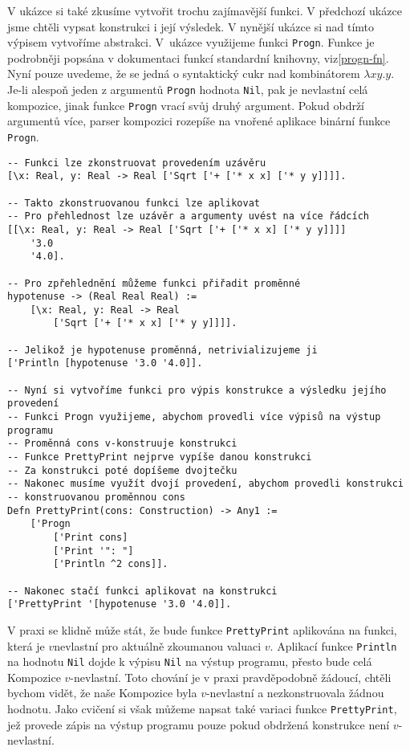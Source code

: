 V ukázce si také zkusíme vytvořit trochu zajímavější funkci. V předchozí ukázce jsme chtěli vypsat
konstrukci i její výsledek. V nynější ukázce si nad tímto výpisem vytvoříme abstrakci. V~ukázce
využijeme funkci \lstinline{Progn}. Funkce je podrobněji popsána v dokumentaci funkcí standardní
knihovny, viz\ref{progn-fn}. Nyní pouze uvedeme, že se jedná o syntaktický cukr
nad kombinátorem $\lambda x y . y$. Je-li alespoň jeden z argumentů \lstinline{Progn} hodnota
\lstinline{Nil}, pak je nevlastní celá kompozice, jinak funkce \lstinline{Progn} vrací svůj druhý
argument. Pokud obdrží argumentů více, parser kompozici rozepíše na vnořené aplikace binární funkce
\lstinline{Progn}.

\begin{lstlisting}[caption={Funkce a uzávěry}, language=Tilscript]
-- Funkci lze zkonstruovat provedením uzávěru
[\x: Real, y: Real -> Real ['Sqrt ['+ ['* x x] ['* y y]]]].

-- Takto zkonstruovanou funkci lze aplikovat
-- Pro přehlednost lze uzávěr a argumenty uvést na více řádcích
[[\x: Real, y: Real -> Real ['Sqrt ['+ ['* x x] ['* y y]]]]
    '3.0
    '4.0].

-- Pro zpřehlednění můžeme funkci přiřadit proměnné
hypotenuse -> (Real Real Real) :=
    [\x: Real, y: Real -> Real
        ['Sqrt ['+ ['* x x] ['* y y]]]].

-- Jelikož je hypotenuse proměnná, netrivializujeme ji
['Println [hypotenuse '3.0 '4.0]].

-- Nyní si vytvoříme funkci pro výpis konstrukce a výsledku jejího provedení
-- Funkci Progn využijeme, abychom provedli více výpisů na výstup programu
-- Proměnná cons v-konstruuje konstrukci
-- Funkce PrettyPrint nejprve vypíše danou konstrukci
-- Za konstrukci poté dopíšeme dvojtečku
-- Nakonec musíme využít dvojí provedení, abychom provedli konstrukci
-- konstruovanou proměnnou cons
Defn PrettyPrint(cons: Construction) -> Any1 :=
    ['Progn
        ['Print cons]
        ['Print '": "]
        ['Println ^2 cons]].

-- Nakonec stačí funkci aplikovat na konstrukci
['PrettyPrint '[hypotenuse '3.0 '4.0]].
\end{lstlisting}

V praxi se klidně může stát, že bude funkce \lstinline{PrettyPrint} aplikována na funkci,
která je $v$nevlastní pro aktuálně zkoumanou valuaci $v$. Aplikací funkce \lstinline{Println}
na hodnotu \lstinline{Nil} dojde k výpisu \lstinline{Nil} na výstup programu, přesto bude celá
Kompozice $v$-nevlastní. Toto chování je v praxi pravděpodobně žádoucí, chtěli bychom vidět, že naše
Kompozice byla $v$-nevlastní a nezkonstruovala žádnou hodnotu. Jako cvičení si však můžeme napsat
také variaci funkce \lstinline{PrettyPrint}, jež provede zápis na výstup programu pouze pokud
obdržená konstrukce není $v$-nevlastní.


